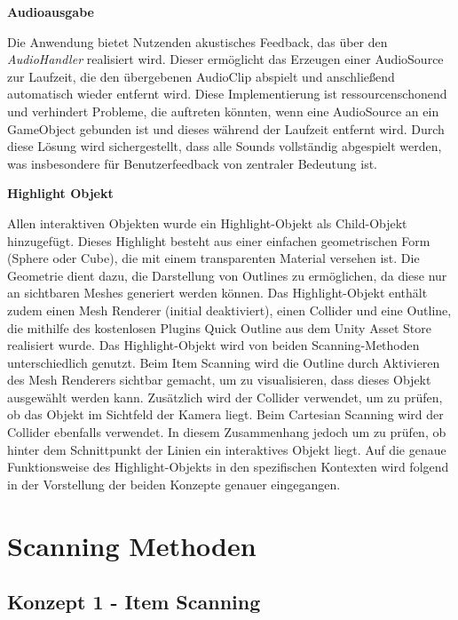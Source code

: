{\normalfont \bfseries Audioausgabe}

Die Anwendung bietet Nutzenden akustisches Feedback, das über den \textit{AudioHandler} realisiert wird. Dieser ermöglicht das Erzeugen einer AudioSource zur Laufzeit, die den übergebenen AudioClip abspielt und anschließend automatisch wieder entfernt wird. Diese Implementierung ist ressourcenschonend und verhindert Probleme, die auftreten könnten, wenn eine AudioSource an ein GameObject gebunden ist und dieses während der Laufzeit entfernt wird. Durch diese Lösung wird sichergestellt, dass alle Sounds vollständig abgespielt werden, was insbesondere für Benutzerfeedback von zentraler Bedeutung ist.

{\normalfont \bfseries Highlight Objekt}

Allen interaktiven Objekten wurde ein Highlight-Objekt als Child-Objekt hinzugefügt. Dieses Highlight besteht aus einer einfachen geometrischen Form (Sphere oder Cube), die mit einem transparenten Material versehen ist. Die Geometrie dient dazu, die Darstellung von Outlines zu ermöglichen, da diese nur an sichtbaren Meshes generiert werden können. Das Highlight-Objekt enthält zudem einen Mesh Renderer (initial deaktiviert), einen Collider und eine Outline, die mithilfe des kostenlosen Plugins Quick Outline aus dem Unity Asset Store realisiert wurde.
Das Highlight-Objekt wird von beiden Scanning-Methoden unterschiedlich genutzt. Beim Item Scanning wird die Outline durch Aktivieren des Mesh Renderers sichtbar gemacht, um zu visualisieren, dass dieses Objekt ausgewählt werden kann. Zusätzlich wird der Collider verwendet, um zu prüfen, ob das Objekt im Sichtfeld der Kamera liegt. Beim Cartesian Scanning wird der Collider ebenfalls verwendet. In diesem Zusammenhang jedoch um zu prüfen, ob hinter dem Schnittpunkt der Linien ein interaktives Objekt liegt. Auf die genaue Funktionsweise des Highlight-Objekts in den spezifischen Kontexten wird folgend in der Vorstellung der beiden Konzepte genauer eingegangen. 


\section{Scanning Methoden}

\subsection{Konzept 1 - Item Scanning }

